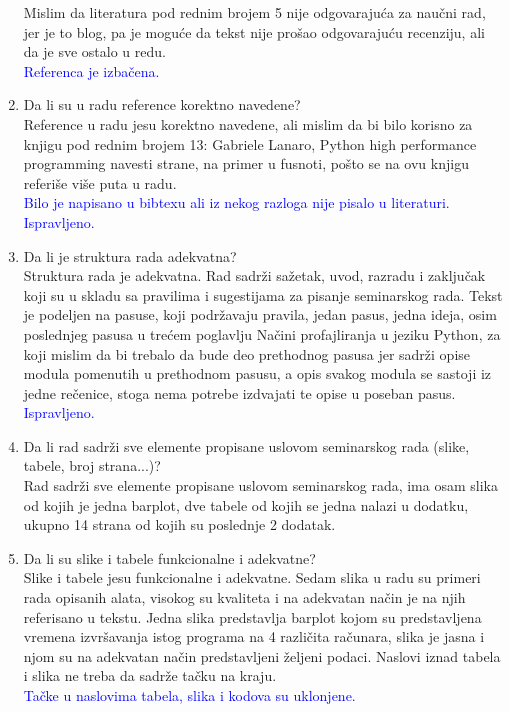 \documentclass[a4paper]{report}
\newcommand{\odgovor}[1]{\textcolor{blue}{#1}}
\begin{document}
\begin{enumerate}
Mislim da literatura pod rednim brojem 5 nije odgovarajuća za naučni rad, jer je to blog, pa je moguće da tekst nije prošao odgovarajuću recenziju, ali da je sve ostalo u redu.\\
\odgovor{Referenca je izbačena.}
\item Da li su u radu reference korektno navedene?\\
Reference u radu jesu korektno navedene, ali mislim da bi bilo korisno za knjigu pod rednim brojem 13: Gabriele Lanaro, Python high performance programming navesti strane, na primer u fusnoti, pošto se na ovu knjigu referiše više puta u radu.\\
\odgovor{Bilo je napisano u bibtexu ali iz nekog razloga nije pisalo u literaturi. Ispravljeno.}
\item Da li je struktura rada adekvatna?\\
Struktura rada je adekvatna. Rad sadrži sažetak, uvod, razradu i zaključak koji su u skladu sa pravilima i sugestijama za pisanje seminarskog rada. Tekst je podeljen na pasuse, koji podržavaju pravila, jedan pasus, jedna ideja, osim poslednjeg pasusa u trećem poglavlju Načini profajliranja u jeziku Python, za koji mislim da bi trebalo da bude deo prethodnog pasusa jer sadrži opise modula pomenutih u prethodnom pasusu, a opis svakog modula se sastoji iz jedne rečenice, stoga nema potrebe izdvajati te opise u poseban pasus.\\
\odgovor{Ispravljeno.}
\item Da li rad sadrži sve elemente propisane uslovom seminarskog rada (slike, tabele, broj strana...)?\\
Rad sadrži sve elemente propisane uslovom seminarskog rada, ima osam slika od kojih je jedna barplot, dve tabele od kojih se jedna nalazi u dodatku, ukupno 14 strana od kojih su poslednje 2 dodatak.
\item Da li su slike i tabele funkcionalne i adekvatne?\\
Slike i tabele jesu funkcionalne i adekvatne. Sedam slika u radu su primeri rada opisanih alata, visokog su kvaliteta i na adekvatan način je na njih referisano u tekstu. Jedna slika predstavlja barplot kojom su predstavljena vremena izvršavanja istog programa na 4 različita računara, slika je jasna i njom su na adekvatan način predstavljeni željeni podaci. Naslovi iznad tabela i slika ne treba da sadrže tačku na kraju.\\
\odgovor{Tačke u naslovima tabela, slika i kodova su uklonjene.}
\end{enumerate}
\end{document}
